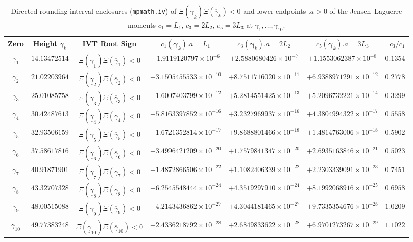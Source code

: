 \documentclass[11pt,a4paper,reqno]{amsart}
\theoremstyle{definition}
\theoremstyle{remark}
\numberwithin{equation}{section}
\begin{document}
\begin{table}[htbp]
\centering
\caption{Directed-rounding interval enclosures (\texttt{mpmath.iv}) of $\Xi(\underline{\gamma}_k)\Xi(\overline{\gamma}_k) < 0$ and lower endpoints $.a > 0$ of the Jensen--Laguerre moments $c_1 = L_1$, $c_3 = 2L_2$, $c_5 = 3L_3$ at $\gamma_1, \dots, \gamma_{10}$.}\label{tab:dipole_zeros}
\scriptsize
\setlength{\tabcolsep}{2.5pt}
\begin{tabular}{ccccccr}
\toprule
\textbf{Zero} & \textbf{Height $\gamma_k$} & \textbf{IVT Root Sign} & \textbf{$c_1(\boldsymbol{\gamma}_k).a = L_1$} & \textbf{$c_3(\boldsymbol{\gamma}_k).a = 2L_2$} & \textbf{$c_5(\boldsymbol{\gamma}_k).a = 3L_3$} & \textbf{$c_3/c_1$} \\
\midrule
$\gamma_1$    & $14.13472514$ & $\Xi(\underline{\gamma}_1)\Xi(\overline{\gamma}_1) < 0$ & $+1.9119120797 \times 10^{-6}$  & $+2.5880680426 \times 10^{-7}$  & $+1.1553062387 \times 10^{-8}$  & $0.1354$ \\
$\gamma_2$    & $21.02203964$ & $\Xi(\underline{\gamma}_2)\Xi(\overline{\gamma}_2) < 0$ & $+3.1505455533 \times 10^{-10}$ & $+8.7511716020 \times 10^{-11}$ & $+6.9388971291 \times 10^{-12}$ & $0.2778$ \\
$\gamma_3$    & $25.01085758$ & $\Xi(\underline{\gamma}_3)\Xi(\overline{\gamma}_3) < 0$ & $+1.6007403799 \times 10^{-12}$ & $+5.2814551425 \times 10^{-13}$ & $+5.2096732221 \times 10^{-14}$ & $0.3299$ \\
$\gamma_4$    & $30.42487613$ & $\Xi(\underline{\gamma}_4)\Xi(\overline{\gamma}_4) < 0$ & $+5.8163397852 \times 10^{-16}$ & $+3.2327969937 \times 10^{-16}$ & $+4.3804994322 \times 10^{-17}$ & $0.5558$ \\
$\gamma_5$    & $32.93506159$ & $\Xi(\underline{\gamma}_5)\Xi(\overline{\gamma}_5) < 0$ & $+1.6721352814 \times 10^{-17}$ & $+9.8688801466 \times 10^{-18}$ & $+1.4814763006 \times 10^{-18}$ & $0.5902$ \\
$\gamma_6$    & $37.58617816$ & $\Xi(\underline{\gamma}_6)\Xi(\overline{\gamma}_6) < 0$ & $+3.4996421209 \times 10^{-20}$ & $+1.7579841347 \times 10^{-20}$ & $+2.6935163846 \times 10^{-21}$ & $0.5023$ \\
$\gamma_7$    & $40.91871901$ & $\Xi(\underline{\gamma}_7)\Xi(\overline{\gamma}_7) < 0$ & $+1.4872866506 \times 10^{-22}$ & $+1.1082406339 \times 10^{-22}$ & $+2.2303339091 \times 10^{-23}$ & $0.7451$ \\
$\gamma_8$    & $43.32707328$ & $\Xi(\underline{\gamma}_8)\Xi(\overline{\gamma}_8) < 0$ & $+6.2545548444 \times 10^{-24}$ & $+4.3519297910 \times 10^{-24}$ & $+8.1992068916 \times 10^{-25}$ & $0.6958$ \\
$\gamma_9$    & $48.00515088$ & $\Xi(\underline{\gamma}_9)\Xi(\overline{\gamma}_9) < 0$ & $+4.2143436862 \times 10^{-27}$ & $+4.3044181465 \times 10^{-27}$ & $+9.7335354676 \times 10^{-28}$ & $1.0209$ \\
$\gamma_{10}$ & $49.77383248$ & $\Xi(\underline{\gamma}_{10})\Xi(\overline{\gamma}_{10}) < 0$ & $+2.4336218792 \times 10^{-28}$ & $+2.6849833622 \times 10^{-28}$ & $+6.9701273267 \times 10^{-29}$ & $1.1022$ \\
\bottomrule
\end{tabular}
\end{table}
\end{document}

